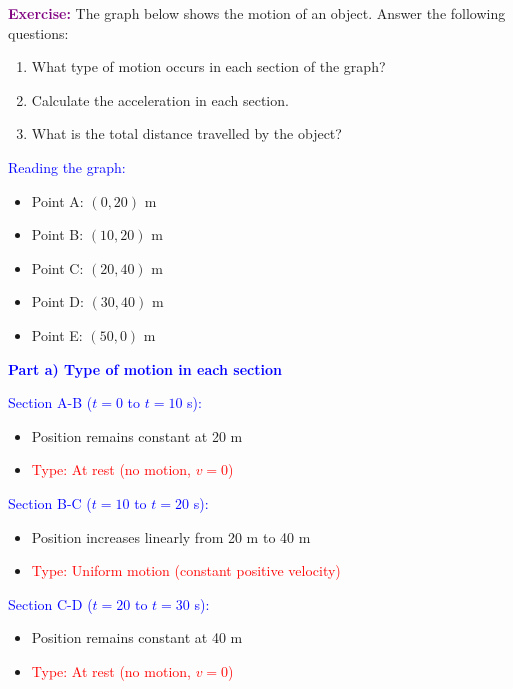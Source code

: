 \begin{exercise}
    \begin{solu}
        \textbf{\textcolor{purple}{Exercise:}} The graph below shows the motion of an object. Answer the following questions:
        \begin{enumerate}[label=\letraminuscula]
            \item What type of motion occurs in each section of the graph?
            \item Calculate the acceleration in each section.
            \item What is the total distance travelled by the object?
        \end{enumerate}

        \vspace{0.3cm}

        \textcolor{blue}{Reading the graph:}
        \begin{itemize}
            \item Point A: $(0, 20)$ m
            \item Point B: $(10, 20)$ m
            \item Point C: $(20, 40)$ m
            \item Point D: $(30, 40)$ m
            \item Point E: $(50, 0)$ m
        \end{itemize}

        \textbf{\textcolor{blue}{Part a) Type of motion in each section}}

        \textcolor{blue}{Section A-B ($t = 0$ to $t = 10$ s):}
        \begin{itemize}
            \item Position remains constant at 20 m
            \item \textcolor{red}{Type: At rest (no motion, $v = 0$)}
        \end{itemize}

        \textcolor{blue}{Section B-C ($t = 10$ to $t = 20$ s):}
        \begin{itemize}
            \item Position increases linearly from 20 m to 40 m
            \item \textcolor{red}{Type: Uniform motion (constant positive velocity)}
        \end{itemize}

        \textcolor{blue}{Section C-D ($t = 20$ to $t = 30$ s):}
        \begin{itemize}
            \item Position remains constant at 40 m
            \item \textcolor{red}{Type: At rest (no motion, $v = 0$)}
        \end{itemize}


\end{solu}
\end{exercise}
